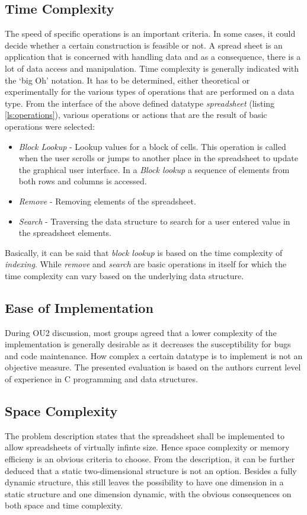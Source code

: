 \documentclass[a4paper,11pt,twoside]{article}
\begin{document}
\subsection{Time Complexity}
The speed of specific operations is an important criteria. In some
cases, it could decide whether a certain construction is feasible
or not. A spread sheet is an application that is concerned with
handling data and as a consequence, there is a lot of data access and
manipulation. Time complexity is generally indicated with the `big Oh'
notation. It has to be determined, either theoretical or
experimentally for the various types of operations that are performed
on a data type. From the interface of the above defined datatype
\textit{spreadsheet} (listing \ref{ls:operations}), various operations
or actions that are the result of basic operations were selected:

\begin{itemize}
\item \textit{Block Lookup} - Lookup values for a block of cells. This operation
  is called when the user scrolls or jumps to another
  place in the spreadsheet to update the graphical user interface. 
  In a \textit{Block lookup} a sequence of elements from both rows and
  columns is accessed. 
\item \textit{Remove} - Removing elements of the spreadsheet.
\item \textit{Search} - Traversing the data structure to search for a
  user entered value in the spreadsheet elements. 
\end{itemize}

Basically, it can be said that \textit{block lookup} is based on the
time complexity of \textit{indexing}. While \textit{remove} and
\textit{search} are basic operations in itself for which the time
complexity can vary based on the underlying data structure.


\subsection{Ease of Implementation}
During OU2 discussion, most groups agreed that a lower complexity
of the implementation is generally desirable as it decreases the
susceptibility for bugs and code maintenance. How complex a certain
datatype is to implement is not an objective measure. The presented
evaluation is based on the authors current level of experience in C
programming and data structures. 


\subsection{Space Complexity}
The problem description states that the spreadsheet shall be
implemented to allow spreadsheets of virtually infinte size. Hence
space complexity or memory efficieny is an obvious criteria to
choose. From the description, it can be further deduced that a static
two-dimensional structure is not an option. Besides a fully dynamic
structure, this still leaves the possibility to have one dimension in
a static structure and one dimension dynamic, with the obvious
consequences on both space and time complexity.
\end{document}
